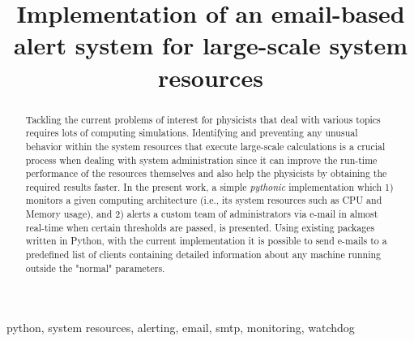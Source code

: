 \documentclass[conference]{IEEEtran}
\begin{document}
\title{Implementation of an email-based alert system for large-scale system resources}

\author{
}

\maketitle

\begin{abstract}
Tackling the current problems of interest for physicists that deal with various topics requires lots of computing simulations. Identifying and preventing any unusual behavior within the system resources that execute large-scale calculations is a crucial process when dealing with system administration since it can improve the run-time performance of the resources themselves and also help the physicists by obtaining the required results faster. In the present work, a simple \emph{pythonic} implementation which 1) monitors a given computing architecture (i.e., its system resources such as CPU and Memory usage), and 2) alerts a custom team of administrators via e-mail in almost real-time when certain thresholds are passed, is presented. Using existing packages written in Python, with the current implementation it is possible to send e-mails to a predefined list of clients containing detailed information about any machine running outside the "normal" parameters.
\end{abstract}

\begin{IEEEkeywords}
python, system resources, alerting, email, smtp, monitoring, watchdog
\end{IEEEkeywords}
\end{document}
